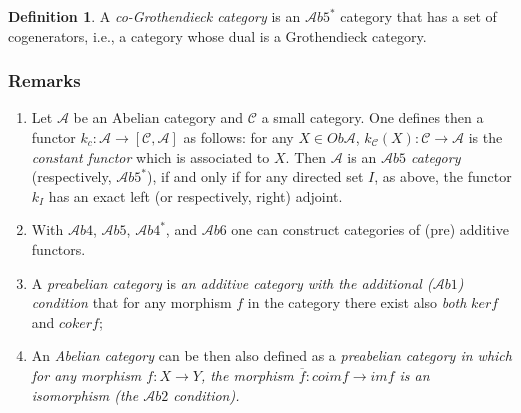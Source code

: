 \documentclass[12pt]{article}
\theoremstyle{plain}
\theoremstyle{definition}
\newtheorem{definition}{Definition}[section]
\numberwithin{equation}{section}
\newcommand{\A}{\mathcal A}
\newcommand{\<}{{\langle}}
\begin{document}
\begin{definition} A \emph{co-Grothendieck category} is an $\mathcal{A}b5^*$ category that has a set of cogenerators,
i.e., a category whose dual is a Grothendieck category.
\end{definition} 

\subsubsection{Remarks}

\begin{enumerate}

\item  Let $\mathcal{\A}$ be an Abelian category and $\mathcal{C}$ a small category. 
One defines then a functor $k_c: \mathcal{\A} \rightarrow [\mathcal{C},\mathcal{\A}]$ 
as follows: for any $X \in Ob \mathcal{\A}$, $k_{\mathcal{C}}(X) : \mathcal{C} \rightarrow \mathcal{\A}$ is the 
{\em constant functor} which is associated to $X$.  Then $\mathcal{\A}$ is an {\em $\mathcal{\A}b5$ category} (respectively, $\mathcal{\A}b5^*$), if and only if for any directed set $I$, as above, the functor $k_I$ has an exact left (or respectively, right) adjoint. 
\item  With $\mathcal{\A}b4$, $\mathcal{\A}b5$, $\mathcal{\A}b4^*$, and $\mathcal{\A}b6$ 
one can construct categories of (pre) additive functors.
\item  A \emph{preabelian category} is {\em an additive category with the additional ($\mathcal{\A}b1$) condition} that for any morphism $f$ in the category there exist also \emph{both} $ker f$ and $coker f$;
\item An \emph{Abelian category} can be then also defined as a \em{preabelian category} in which for any morphism $f:X \to Y$, the morphism $ \overline{f} : coim f \to im f$ is an isomorphism (the $\mathcal{\A}b2$ condition).

\end{enumerate}
\end{document}
